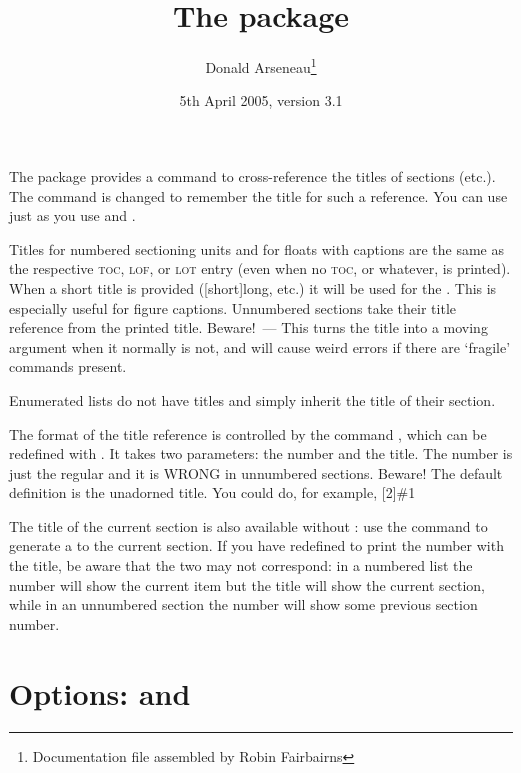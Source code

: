 \documentclass[a4paper]{article}
\begin{document}
\title{The  package}
\author{Donald Arseneau\thanks{Documentation file assembled by Robin
    Fairbairns}}
\date{5th April 2005, version 3.1}
\maketitle

The package provides a command  to cross-reference the
titles of sections (etc.).  The  command is changed to
remember the title for such a reference.  You can use 
just as you use  and .

Titles for numbered sectioning units and for floats with captions are
the same as the respective \textsc{toc}, \textsc{lof}, or \textsc{lot}
entry (even when no \textsc{toc}, or whatever, is printed).  When a
short title is provided ([short]{long}, etc.\@) it
will be used for the .  This is especially useful for
figure captions.  Unnumbered sections take their title reference from
the printed title.  Beware!~--- This turns the title into a moving
argument when it normally is not, and will cause weird errors if there
are `fragile' commands present.

Enumerated lists do not have titles and simply inherit the title of
their section.

The format of the title reference is controlled by the command
, which can be redefined with .
It takes two parameters: the number and the title. The number is
just the regular  and it is WRONG in unnumbered sections.
Beware!  The default definition is the unadorned title.  You could
do, for example,
[2]{\#1\cs{\ }}

The title of the current section is also available without :
use the command  to generate a  to the
current section.  If you have redefined  to
print the number with the title, be aware that the two may not
correspond: in a numbered list the number will show the current item
but the title will show the current section, while in an unnumbered
section the number will show some previous section number.

\section*{Options:  \option[usetoc]  and  \option[nostar]}
\end{document}
